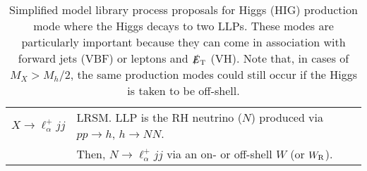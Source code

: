 \begin{table}
\begin{center}
\begin{tabular}{ |c|l|}
\hline
$X\rightarrow \ell_\alpha^+jj$ & LRSM.  LLP is the RH neutrino  ($N$)   produced via $pp\rightarrow h$, $h\rightarrow NN$.   \\
&  Then, $N\rightarrow \ell_\alpha^+jj$ via  an on- or off-shell $W$ (or $W_{\rm R}$).\\
\hline
\end{tabular}
\end{center}
\caption{Simplified model library process proposals for Higgs (HIG) production mode where the Higgs decays to two LLPs. These modes are particularly important because they can come in association with forward jets (VBF) or leptons and $\slashed{E}_{\rm T}$ (VH). Note that, in cases of $M_X>M_h/2$, the same production modes could still occur if the Higgs is taken to be off-shell.  }\label{tab:Higgs_neutral_library}
\end{table}

